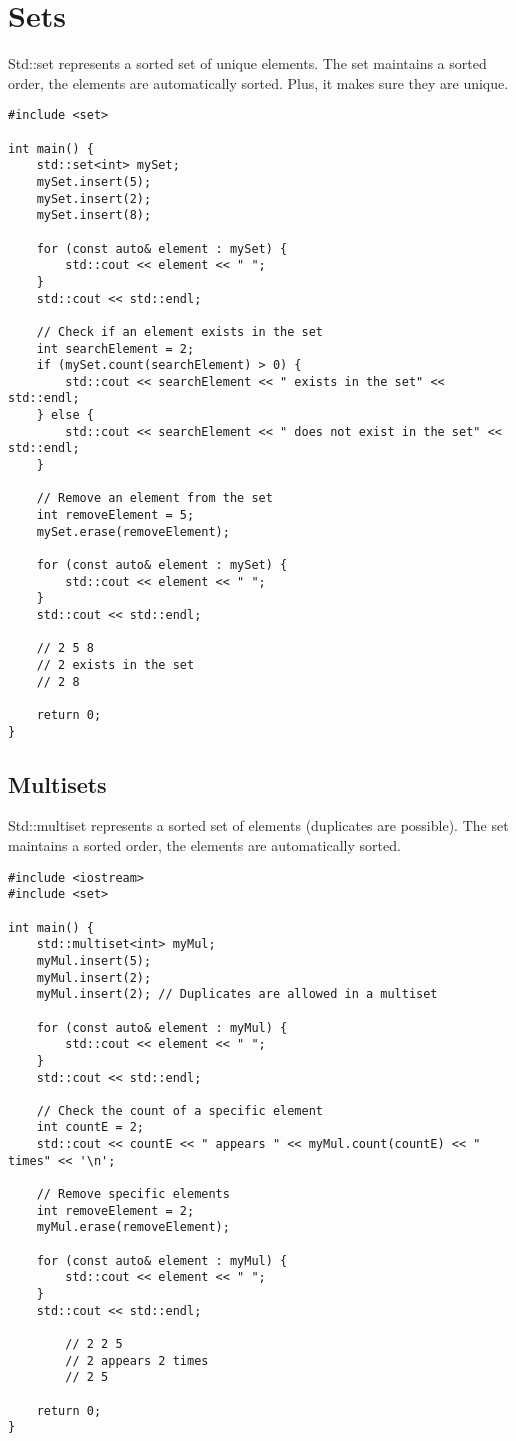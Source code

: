 \documentclass[openany]{report}
\begin{document}
\section{Sets}

Std::set represents a sorted set of unique elements. The set maintains a sorted order,
the elements are automatically sorted. Plus, it makes sure they are unique.

\begin{verbatim}
#include <set>

int main() {
    std::set<int> mySet;
    mySet.insert(5);
    mySet.insert(2);
    mySet.insert(8);

    for (const auto& element : mySet) {
        std::cout << element << " ";
    }
    std::cout << std::endl;

    // Check if an element exists in the set
    int searchElement = 2;
    if (mySet.count(searchElement) > 0) {
        std::cout << searchElement << " exists in the set" << std::endl;
    } else {
        std::cout << searchElement << " does not exist in the set" << std::endl;
    }

    // Remove an element from the set
    int removeElement = 5;
    mySet.erase(removeElement);

    for (const auto& element : mySet) {
        std::cout << element << " ";
    }
    std::cout << std::endl;
    
    // 2 5 8
    // 2 exists in the set
    // 2 8

    return 0;
}
\end{verbatim}

\subsection{Multisets}

Std::multiset represents a sorted set of elements (duplicates are possible). The set maintains a sorted order,
the elements are automatically sorted.

\begin{verbatim}
#include <iostream>
#include <set>

int main() {
    std::multiset<int> myMul;
    myMul.insert(5);
    myMul.insert(2);
    myMul.insert(2); // Duplicates are allowed in a multiset

    for (const auto& element : myMul) {
        std::cout << element << " ";
    }
    std::cout << std::endl;

    // Check the count of a specific element
    int countE = 2;
    std::cout << countE << " appears " << myMul.count(countE) << " times" << '\n';

    // Remove specific elements
    int removeElement = 2;
    myMul.erase(removeElement);

    for (const auto& element : myMul) {
        std::cout << element << " ";
    }
    std::cout << std::endl;

        // 2 2 5
        // 2 appears 2 times
        // 2 5 

    return 0;
}
\end{verbatim}
\end{document}
